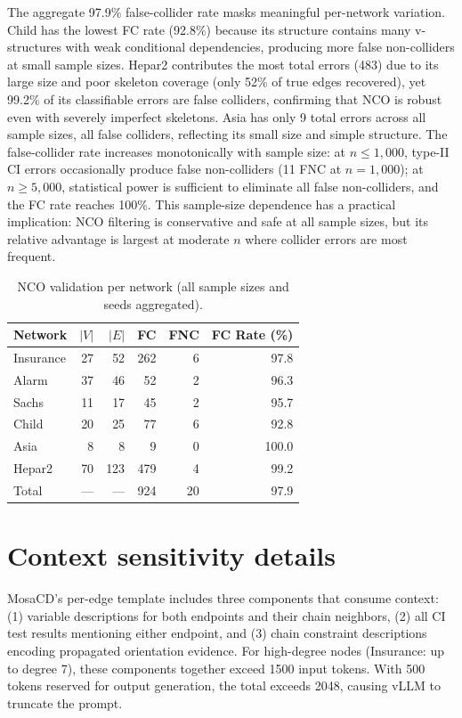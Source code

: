 \documentclass{article} %
\begin{document}
The aggregate 97.9\% false-collider rate masks meaningful per-network variation. Child has the lowest FC rate (92.8\%) because its structure contains many v-structures with weak conditional dependencies, producing more false non-colliders at small sample sizes. Hepar2 contributes the most total errors (483) due to its large size and poor skeleton coverage (only 52\% of true edges recovered), yet 99.2\% of its classifiable errors are false colliders, confirming that NCO is robust even with severely imperfect skeletons. Asia has only 9 total errors across all sample sizes, all false colliders, reflecting its small size and simple structure. The false-collider rate increases monotonically with sample size: at $n \leq 1{,}000$, type-II CI errors occasionally produce false non-colliders (11 FNC at $n{=}1{,}000$); at $n \geq 5{,}000$, statistical power is sufficient to eliminate all false non-colliders, and the FC rate reaches 100\%. This sample-size dependence has a practical implication: NCO filtering is conservative and safe at all sample sizes, but its relative advantage is largest at moderate $n$ where collider errors are most frequent.

\begin{table}[h]
\centering
\caption{NCO validation per network (all sample sizes and seeds aggregated).}
\small
\begin{tabular}{lrrrrr}
\toprule
Network & $|V|$ & $|E|$ & FC & FNC & FC Rate (\%) \\
\midrule
Insurance & 27 & 52 & 262 & 6 & 97.8 \\
Alarm     & 37 & 46 & 52  & 2 & 96.3 \\
Sachs     & 11 & 17 & 45  & 2 & 95.7 \\
Child     & 20 & 25 & 77  & 6 & 92.8 \\
Asia      & 8  & 8  & 9   & 0 & 100.0 \\
Hepar2    & 70 & 123 & 479 & 4 & 99.2 \\
\midrule
Total     & ---& --- & 924 & 20 & 97.9 \\
\bottomrule
\end{tabular}
\end{table}

\section{Context sensitivity details}
\label{app:context}

MosaCD's per-edge template includes three components that consume context: (1) variable descriptions for both endpoints and their chain neighbors, (2) all CI test results mentioning either endpoint, and (3) chain constraint descriptions encoding propagated orientation evidence. For high-degree nodes (Insurance: up to degree 7), these components together exceed 1500 input tokens. With 500 tokens reserved for output generation, the total exceeds 2048, causing vLLM to truncate the prompt.
\end{document}
